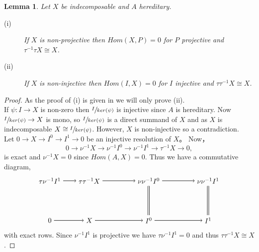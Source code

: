 \documentclass[11.5pt, twoside, a4paper, titlepage]{report}
\theoremstyle{definition}
\theoremstyle{plain}
\newtheorem{lem}[mydef]{Lemma}
\begin{document}
\begin{lem} \label{tauidlem}
Let $X$ be indecomposable and $A$ hereditary.
\begin{description}
\item [(i)] If $X$ is non-projective then $Hom(X,P)=0$ for $P$ projective and $\tau^{-1}\tau X \cong X$.
\item [(ii)] If $X$ is non-injective then $Hom(I,X)=0$ for $I$ injective and $\tau \tau^{-1}X\cong X$.
\end{description}
\end{lem}
\begin{proof}
As the proof of (i) is given in \cite{CB2} we will only prove (ii).\\
If $\psi: I \to X$ is non-zero then $\sfrac{I}{ker(\psi)}$ is injective since $A$ is hereditary. Now $\sfrac{I}{ker(\psi)} \to X$ is mono, so $\sfrac{I}{ker(\psi)}$ is a direct summand of $X$ and as $X$ is indecomposable $X\cong \sfrac{I}{ker(\psi)}$. However, $X$ is non-injective so a contradiction.\\
Let $0 \to X \to I^0 \to I^1 \to 0$ be an injective resolution of $X$。 Now， 
\begin{equation*}
0 \to \nu^{-1}X \to \nu^{-1}I^0 \to \nu^{-1}I^1 \to \tau^{-1}X \to 0,
\end{equation*}
is exact and $\nu^{-1}X=0$ since $Hom(A,X)=0$. Thus we have a commutative diagram, 
\begin{equation*}
\begin{tikzpicture}[->,-latex, auto, main path/.style={->, semithick}, main node/.style={}]
\node	[main node]		(2) at (1,0)		{$\tau\nu^{-1}I^1$};
\node	[main node]		(3) at (3,0)		{$\tau\tau^{-1}X$};
\node [main node]		(4) at (6,0)		{$\nu\nu^{-1}I^0$};
\node [main node]		(5) at (9,0)		{$\nu\nu^{-1}I^1$};

\node	[main node]		(15) at (1,-2)		{$0$};
\node	[main node]		(16) at (3,-2)		{$X$};
\node [main node]		(17) at (6,-2)		{$I^0$};
\node [main node]		(18) at (9,-2)		{$I^1$};

\draw (2) edge [main path] node [auto] {$$} (3);
\draw (3) edge [main path] node [auto] {$$} (4);
\draw (4) edge [main path] node [auto] {$$} (5);

\draw (15) edge [main path] node [auto] {$$} (16);
\path (16) edge [main path] node [auto] {$$} (17);
\draw (17) edge [main path] node [auto] {$$} (18);

\draw (17) edge [-, double, semithick, double distance=1.5pt] (4);
\draw (18) edge [-, double, semithick, double distance=1.5pt] (5);
\end{tikzpicture}
\end{equation*}
with exact rows. Since $\nu^{-1}I^1$ is projective we have $\tau \nu^{-1} I^1=0$ and thus $\tau\tau^{-1}X\cong X$.
\end{proof}
\end{document}
